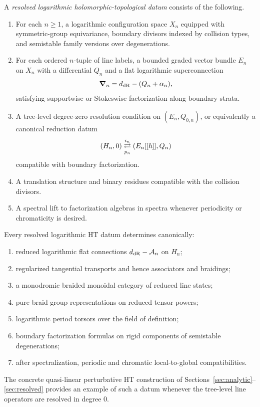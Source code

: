 \begin{definition}\label{def:rlht-datum}
A \emph{resolved logarithmic holomorphic-topological datum} consists of the following.
\begin{enumerate}[label=\textup{(\roman*)}]
 \item For each $n\ge 1$, a logarithmic configuration space $X_n$ equipped with symmetric-group equivariance, boundary divisors indexed by collision types, and semistable family versions over degenerations.
 \item For each ordered $n$-tuple of line labels, a bounded graded vector bundle $E_n$ on $X_n$ with a differential $Q_n$ and a flat logarithmic superconnection
 \[
 \boldsymbol{\nabla}_n = d_{\mathrm{dR}}-(Q_n+\alpha_n),
 \]
 satisfying supportwise or Stokeswise factorization along boundary strata.
 \item A tree-level degree-zero resolution condition on $(E_n,Q_{0,n})$, or equivalently a canonical reduction datum
 \[
 (H_n,0) \underset{p_n}{\stackrel{i_n}{\rightleftarrows}} (E_n[[\hbar]],Q_n)
 \]
 compatible with boundary factorization.
 \item A translation structure and binary residues compatible with the collision divisors.
 \item A spectral lift to factorization algebras in spectra whenever periodicity or chromaticity is desired.
\end{enumerate}
\end{definition}

\begin{theorem}\label{thm:platonic-ideal}
Every resolved logarithmic HT datum determines canonically:
\begin{enumerate}[label=\textup{(\roman*)}]
 \item reduced logarithmic flat connections $d_{\mathrm{dR}}-\mathcal A_n$ on $H_n$;
 \item regularized tangential transports and hence associators and braidings;
 \item a monodromic braided monoidal category of reduced line states;
 \item pure braid group representations on reduced tensor powers;
 \item logarithmic period torsors over the field of definition;
 \item boundary factorization formulas on rigid components of semistable degenerations;
 \item after spectralization, periodic and chromatic local-to-global compatibilities.
\end{enumerate}
The concrete quasi-linear perturbative HT construction of Sections~\ref{sec:analytic}--\ref{sec:resolved} provides an example of such a datum whenever the tree-level line operators are resolved in degree $0$.
\end{theorem}

